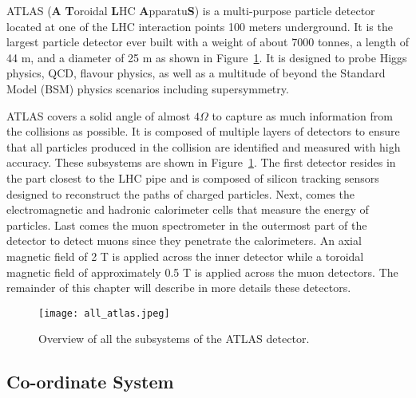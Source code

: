 ATLAS (\textbf{A} \textbf{T}oroidal \textbf{L}HC \textbf{A}pparatu\textbf{S}) is a 
multi-purpose particle detector located at one of the 
LHC interaction points 100 meters underground. 
It is the largest particle detector ever built with a weight of about 7000 tonnes, a length of 44 m, 
and a diameter of 25 m as shown in Figure~\ref{fig:exp.atlas.atlas}.
It is designed to probe Higgs physics, QCD, flavour physics, as well as a multitude of beyond the Standard Model (BSM) physics scenarios including 
supersymmetry.

ATLAS covers a solid angle of almost $4\Omega$ to capture as much information from the collisions 
as possible. 
It is composed of multiple layers of detectors to ensure that all particles produced in the 
collision are identified and measured with high accuracy.
These subsystems are shown in Figure~\ref{fig:exp.atlas.atlas}.
The first detector resides in the part closest to the
LHC pipe and is composed of silicon tracking sensors designed to reconstruct the paths
of charged particles. 
Next, comes the electromagnetic and hadronic calorimeter cells that 
measure the energy of particles. Last comes the muon spectrometer in the outermost part of the 
detector to detect muons since they penetrate the calorimeters. 
An axial magnetic field of 2 T is applied across the inner detector while a toroidal magnetic field 
of approximately 0.5 T is applied across the muon detectors.
The remainder of this chapter will describe in more details these detectors.




\begin{figure}[t!]
\centering
\texttt{[image: all\_atlas.jpeg]}
\caption{Overview of all the subsystems of the ATLAS detector.}%
\label{fig:exp.atlas.atlas}
\end{figure} 




\subsection{Co-ordinate System}

